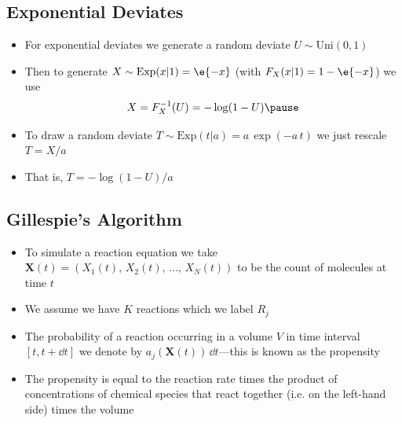 
\begin{slide}
\section{Exponential Deviates}

\begin{PauseHighLight}
  \begin{itemize}
  \item For exponential deviates we generate a random deviate
    $U\sim\mathrm{Uni}(0,1)$\pause
  \item Then to generate $X\sim\mathrm{Exp}(x|1)=\e{-x}$ (with $F_X(x|1)
    = 1-\e{-x}$) we use
    \begin{align*}
      X = F_X^{-1}(U) = -\log(1-U)\pause
    \end{align*}
  \item To draw a random deviate $T \sim \mathrm{Exp}(t|a) =
    a\,\exp(-a\,t)$ we just rescale $T = X/a$\pause
  \item That is, $T=-\log(1-U)/a$\pause
  \end{itemize}
\end{PauseHighLight}

\end{slide}


\begin{slide}
\section{Gillespie's Algorithm}

\begin{PauseHighLight}
  \begin{itemize}
  \item To simulate a reaction equation we take $\bm{X}(t) =
    (X_1(t),\,X_2(t),\,\ldots,\,X_N(t))$ to be the count of molecules at
    time $t$\pause
  \item We assume we  have $K$ reactions which we label $R_j$\pause
  \item The probability of a reaction occurring in a volume $V$ in
    time interval $[t,t+\dd t]$ we denote by
    $a_j(\bm{X}(t))\,\dd t$---this is known as the propensity\pause
  \item The propensity is equal to the reaction rate times the product
    of concentrations of chemical species that react together (i.e. on
    the left-hand side) times the volume\pause
  \end{itemize}
\end{PauseHighLight}

\end{slide}

